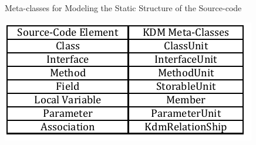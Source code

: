 \documentclass[12pt]{article}
\let\cite=\citep
\begin{document}
\begin{table}[!h]
\caption{Meta-classes for Modeling the Static Structure of the Source-code}
\label{tab:mappingCodeToKDM}
\centering
  \includegraphics[scale=1]{Figure/TabelaPAraUsarNoVEM}
\end{table}


\end{document}
